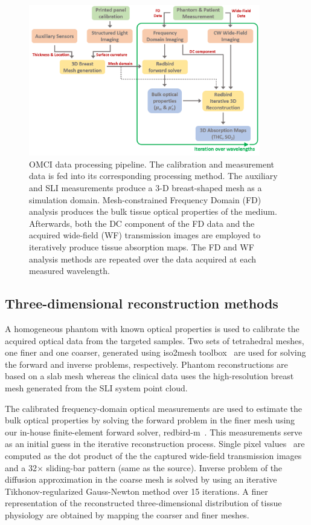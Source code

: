 \begin{figure}[]
\centering
\includegraphics[width=0.90\textwidth]{fig/omci/OMCIWorkflow_280720.png}
\caption{OMCI data processing pipeline. The calibration and measurement data is fed into its corresponding processing method. The auxiliary and SLI measurements produce a 3-D breast-shaped mesh as a simulation domain. Mesh-constrained Frequency Domain (FD) analysis produces the bulk tissue optical properties of the medium. Afterwards, both the DC component of the FD data and the acquired wide-field (WF) transmission images are employed to iteratively produce tissue absorption maps. The FD and WF analysis methods are repeated over the data acquired at each measured wavelength.}
\label{fig:DataAnalysis}
\end{figure}


\subsection{Three-dimensional reconstruction methods}
\label{Sec:FDanalysis}
A homogeneous phantom with known optical properties is used to calibrate the acquired optical data from the targeted samples. Two sets of tetrahedral meshes, one finer and one coarser, generated using iso2mesh toolbox~\cite{Fang2009} are used for solving the forward and inverse problems, respectively. Phantom reconstructions are based on a slab mesh whereas the clinical data uses the high-resolution breast mesh generated from the SLI system point cloud.

The calibrated frequency-domain optical measurements are used to estimate the bulk optical properties by solving the forward problem in the finer mesh using our in-house finite-element forward solver, redbird-m~\cite{Redbird2008}. This measurements serve as an initial guess in the iterative reconstruction process. Single pixel values~\cite{Yao2015} are computed as the dot product of the the captured wide-field transmission images and a 32$\times$ sliding-bar pattern (same as the source). Inverse problem of the diffusion approximation in the coarse mesh is solved by using an iterative Tikhonov-regularized Gauss-Newton method over 15 iterations. A finer representation of the reconstructed three-dimensional distribution of tissue physiology are obtained by mapping the coarser and finer meshes.



